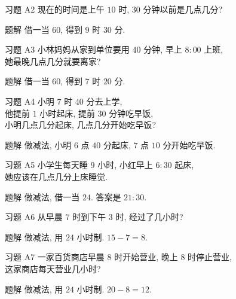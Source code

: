 \documentclass[content.tex]{subfiles}
\begin{document}
\begin{frame}{习题 A2}
现在的时间是上午 $10$ 时, $30$ 分钟以前是几点几分?
\begin{exampleblock}{题解}
借一当 $60$, 得到 $9$ 时 $30$ 分.
\end{exampleblock}
\end{frame}

\begin{frame}{习题 A3}
小林妈妈从家到单位要用 $40$ 分钟, 早上 $8:00$ 上班, \\ 她最晚几点几分就要离家?
\begin{exampleblock}{题解}
借一当 $60$, 得到 $7$ 时 $20$ 分.
\end{exampleblock}
\end{frame}

\begin{frame}{习题 A4}
小明 $7$ 时 $40$ 分去上学, \\
他提前 $1$ 小时起床, 提前 $30$ 分钟吃早饭, \\
小明几点几分起床, 几点几分开始吃早饭? \\
\begin{exampleblock}{题解}
做减法, 小明 $6$ 点 $40$ 分起床, $7$ 点 $10$ 分开始吃早饭. \\
\end{exampleblock}
\end{frame}

\begin{frame}{习题 A5}
小学生每天睡 $9$ 小时, 小红早上 $6:30$ 起床, \\
她应该在几点几分上床睡觉. 
\begin{exampleblock}{题解}
做减法, 借一当 $24$. 答案是 $21:30$. \\
\end{exampleblock}
\end{frame}

\begin{frame}{习题 A6}
从早晨 $7$ 时到下午 $3$ 时, 经过了几小时? 
\begin{exampleblock}{题解}
做减法, 用 $24$ 小时制. $15 - 7 = 8$. 
\end{exampleblock}
\end{frame}

\begin{frame}{习题 A7}
一家百货商店早晨 $8$ 时开始营业, 晚上 $8$ 时停止营业, \\ 这家商店每天营业几小时?
\begin{exampleblock}{题解}
做减法, 用 $24$ 小时制. $20 - 8 = 12$.
\end{exampleblock}
\end{frame}
\end{document}
